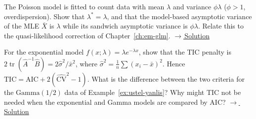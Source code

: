 \documentclass[main.tex]{subfiles}
\begin{document}
\begin{exercise}\label{exr:12-6}
The Poisson model is fitted to count data with mean $\lambda$ and variance $\phi\lambda$ ($\phi>1$, overdispersion). Show that $\lambda^*=\lambda$, and that the model-based asymptotic variance of the MLE $\bar X$ is $\lambda$ while its sandwich asymptotic variance is $\phi\lambda$. Relate this to the quasi-likelihood correction of Chapter~\ref{ch:em-glm}.
\hfill\hyperref[coz:12-6]{\footnotesize$\rightarrow$\,Solution}
\end{exercise}

\begin{exercise}\label{exr:12-7}
For the exponential model $f(x;\lambda)=\lambda e^{-\lambda x}$, show that the TIC penalty is $2\operatorname{tr}(\hat A^{-1}\hat B)=2\hat\sigma^2/\bar x^2$, where $\hat\sigma^2=\frac1n\sum(x_i-\bar x)^2$. Hence $\mathrm{TIC}=\mathrm{AIC}+2(\widehat{\mathrm{CV}}^2-1)$. What is the difference between the two criteria for the $\text{Gamma}(1/2)$ data of Example~\ref{ex:ustel-yanlis}? Why might TIC not be needed when the exponential and Gamma models are compared by AIC?
\hfill\hyperref[coz:12-7]{\footnotesize$\rightarrow$\,Solution}
\end{exercise}

\end{document}
